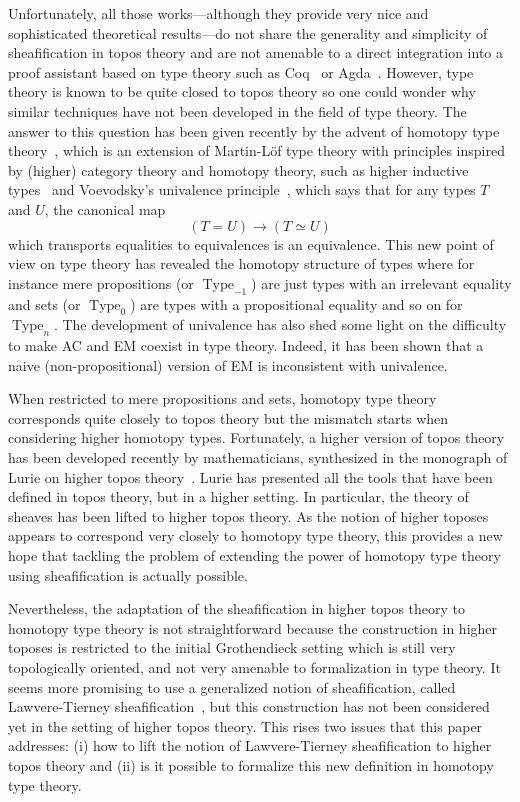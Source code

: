\documentclass[conference]{IEEEtran}
\DeclareMathOperator{\Type}{Type}
\begin{document}
Unfortunately, all those works---although they provide very nice and
sophisticated theoretical results---do not share the generality and
simplicity of sheafification in topos theory and are not amenable to a
direct integration into a proof assistant based on type theory such as
Coq~\cite{coq:refman:8.4} or Agda~\cite{norell2007towards}.  
%
However, type theory is known to be quite closed to topos theory so
one could wonder why similar techniques have not been developed in the
field of type theory. 
%
The answer to this question has been given recently by the advent of
homotopy type theory~\cite{hottbook}, which is an extension of
Martin-Löf type theory with principles inspired by (higher) category
theory and homotopy theory, such as higher inductive
types~\cite{lumsdaine2011higher,lumsdaine2013higher} and
Voevodsky's univalence principle~\cite{kapulkin2012simplicial}, which
says that for any types $T$ and $U$, the canonical map 
$$
(T = U) \to (T \simeq U)
$$ 
%
which transports equalities to equivalences is an equivalence.
%
This new point of view on type theory has revealed the homotopy
structure of types where for instance mere propositions (or
$\Type_{-1}$) are just types with an
irrelevant equality and sets (or $\Type_{0}$) are types
with a propositional equality and so on for $\Type_{n}$.
%
The development of univalence has also shed some light on the
difficulty to make AC and EM coexist in type theory. Indeed, it
has been shown that a naive (non-propositional) version of EM is
inconsistent with univalence.

When restricted to mere propositions and sets, homotopy type
theory corresponds quite closely to topos theory but the mismatch
starts when considering higher homotopy types.
%
Fortunately, a higher version of topos theory has been developed
recently by mathematicians, synthesized in the monograph of Lurie on
higher topos theory~\cite{lurie}. 
%
Lurie has presented all the tools that have been defined in
topos theory, but in a higher setting. In particular, the theory of
sheaves has been lifted to higher topos theory.
%
As the notion of higher toposes appears to correspond very closely to
homotopy type theory, this provides a new hope that tackling the
problem of extending the power of homotopy type theory using
sheafification is actually possible.

Nevertheless, the adaptation of the sheafification in higher topos
theory to homotopy type theory is not straightforward because the
construction in higher toposes is restricted to the initial Grothendieck
setting which is still very topologically oriented, and not very
amenable to formalization in type theory. It seems more promising to
use a generalized notion of sheafification, called Lawvere-Tierney
sheafification~\cite{tierney1972sheaf,maclanemoerdijk}, but this construction has not
been considered yet in the setting of higher topos theory. This rises
two issues that this paper addresses: (i) how to lift the notion of
Lawvere-Tierney sheafification to higher topos theory and (ii) is it
possible to formalize this new definition in homotopy type theory.
\end{document}
